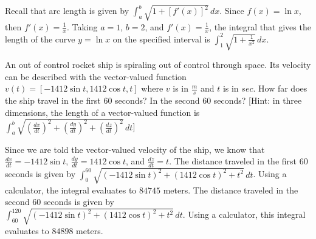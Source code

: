 \begin{Answer}[ref=length3]
Recall that arc length is given by $\int_a^b \sqrt{1 + [f'(x)]^2}\,dx$. 
Since $f(x) = \ln{x}$, then $f'(x) = \frac{1}{x}$. Taking $a = 1$, 
$b = 2$, and $f'(x) = \frac{1}{x}$, the integral that gives the length 
of the curve $y = \ln{x}$ on the specified interval is $\int_1^2 
\sqrt{1+\frac{1}{x^2}}\,dx$. 
\end{Answer}

\begin{Exercise}[label = length4]
	An out of control rocket ship is spiraling out of control through 
	space. Its velocity can be described with the vector-valued function 
	$v(t) = [-1412\sin{t}, 1412\cos{t}, t]$ where $v$ is in $\frac{m}{s}$ 
	and $t$ is in $sec$. How far does the ship travel in the first 60 
	seconds? In the second 60 seconds? [Hint: in three dimensions, the 
	length of a vector-valued function is $\int_a^b 
	\sqrt{(\frac{dx}{dt})^2 + (\frac{dy}{dt})^2 + (\frac{dz}{dt})^2}\,dt$]
\end{Exercise}

\begin{Answer}[ref= length4]
	Since we are told the vector-valued velocity of the ship, we know 
	that $\frac{dx}{dt} = -1412\sin{t}$, $\frac{dy}{dt} = 1412\cos{t}$, 
	and $\frac{dz}{dt} = t$. The distance traveled in the first 60 
	seconds is given by $\int_0^{60} \sqrt{(-1412\sin{t})^2 + 
	(1412\cos{t})^2 + t^2}\,dt$. Using a calculator, the integral 
	evaluates to $84745$ meters. The distance traveled in the second 60 
	seconds is given by \\$\int_{60}^{120} \sqrt{(-1412\sin{t})^2 + 
	(1412\cos{t})^2 + t^2}\,dt$. Using a calculator, this integral 
	evaluates to $84898$ meters.
\end{Answer}






